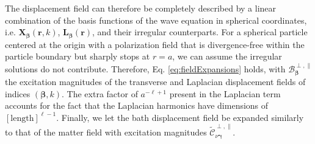 \documentclass{article}
\begin{document}
The displacement field can therefore be completely described by a linear combination of the basis functions of the wave equation in spherical coordinates, i.e. $\mathbf{X}_{\bm{\beta}}(\mathbf{r},k)$, $\mathbf{L}_{\bm{\beta}}(\mathbf{r})$, and their irregular counterparts. For a spherical particle centered at the origin with a polarization field that is divergence-free within the particle boundary but sharply stops at $r = a$, we can assume the irregular solutions do not contribute. Therefore, Eq. \eqref{eq:fieldExpansions} holds, with $\mathcal{B}_{\bm{\beta}}^{\perp,\parallel}$ the excitation magnitudes of the transverse and Laplacian displacement fields of indices $(\bm{\beta},k)$. The extra factor of $a^{-\ell + 1}$ present in the Laplacian term accounts for the fact that the Laplacian harmonics have dimensions of $[\mathrm{length}]^{\ell - 1}$. Finally, we let the bath displacement field be expanded similarly to that of the matter field with excitation magnitudes $\tilde{\mathcal{C}}_{\nu\bm{\gamma}}^{\perp,\parallel}$.
\end{document}
